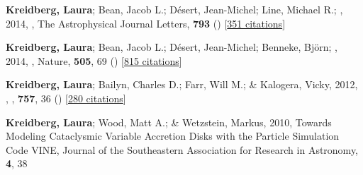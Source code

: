 \item[{\color{numcolor}\scriptsize4}] \textbf{Kreidberg, Laura}; Bean, Jacob L.; D{\'e}sert, Jean-Michel; Line, Michael R.; \etal, 2014, , The Astrophysical Journal Letters, \textbf{793} () [\href{https://ui.adsabs.harvard.edu/abs/2014ApJ...793L..27K}{351 citations}]

\item[{\color{numcolor}\scriptsize3}] \textbf{Kreidberg, Laura}; Bean, Jacob L.; D{\'e}sert, Jean-Michel; Benneke, Bj{\"o}rn; \etal, 2014, , Nature, \textbf{505}, 69 () [\href{https://ui.adsabs.harvard.edu/abs/2014Natur.505...69K}{815 citations}]

\item[{\color{numcolor}\scriptsize2}] \textbf{Kreidberg, Laura}; Bailyn, Charles D.; Farr, Will M.; \& Kalogera, Vicky, 2012, , \apj, \textbf{757}, 36 () [\href{https://ui.adsabs.harvard.edu/abs/2012ApJ...757...36K}{280 citations}]

\item[{\color{numcolor}\scriptsize1}] \textbf{Kreidberg, Laura}; Wood, Matt A.; \& Wetzstein, Markus, 2010, Towards Modeling Cataclysmic Variable Accretion Disks with the Particle Simulation Code VINE, Journal of the Southeastern Association for Research in Astronomy, \textbf{4}, 38